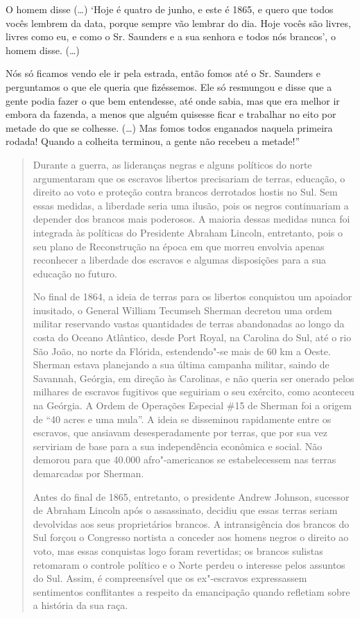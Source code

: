 O homem disse (\ldots{}) `Hoje é quatro de junho, e este é 1865, e quero
que todos vocês lembrem da data, porque sempre vão lembrar do dia. Hoje
vocês são livres, livres como eu, e como o Sr. Saunders e a sua senhora
e todos nós brancos', o homem disse. (\ldots{})

Nós só ficamos vendo ele ir pela estrada, então fomos até o Sr. Saunders
e perguntamos o que ele queria que fizéssemos. Ele só resmungou e disse
que a gente podia fazer o que bem entendesse, até onde sabia, mas que
era melhor ir embora da fazenda, a menos que alguém quisesse ficar e
trabalhar no eito por metade do que se colhesse. (\ldots{}) Mas fomos
todos enganados naquela primeira rodada! Quando a colheita terminou, a
gente não recebeu a metade!''

\begin{quote}
Durante a guerra, as lideranças negras e alguns políticos do norte
argumentaram que os escravos libertos precisariam de terras, educação, o
direito ao voto e proteção contra brancos derrotados hostis no Sul. Sem
essas medidas, a liberdade seria uma ilusão, pois os negros continuariam
a depender dos brancos mais poderosos. A maioria dessas medidas nunca
foi integrada às políticas do Presidente Abraham Lincoln, entretanto,
pois o seu plano de Reconstrução na época em que morreu envolvia apenas
reconhecer a liberdade dos escravos e algumas disposições para a sua
educação no futuro.

No final de 1864, a ideia de terras para os libertos conquistou um
apoiador inusitado, o General William Tecumseh Sherman decretou uma
ordem militar reservando vastas quantidades de terras abandonadas ao
longo da costa do Oceano Atlântico, desde Port Royal, na Carolina do
Sul, até o rio São João, no norte da Flórida, estendendo"-se mais de 60
km a Oeste. Sherman estava planejando a sua última campanha militar,
saindo de Savannah, Geórgia, em direção às Carolinas, e não queria ser
onerado pelos milhares de escravos fugitivos que seguiriam o seu
exército, como aconteceu na Geórgia. A Ordem de Operações Especial \#15
de Sherman foi a origem de ``40 acres e uma mula''. A ideia se
disseminou rapidamente entre os escravos, que ansiavam desesperadamente
por terras, que por sua vez serviriam de base para a sua independência
econômica e social. Não demorou para que 40.000 afro"-americanos se
estabelecessem nas terras demarcadas por Sherman.

Antes do final de 1865, entretanto, o presidente Andrew Johnson,
sucessor de Abraham Lincoln após o assassinato, decidiu que essas terras
seriam devolvidas aos seus proprietários brancos. A intransigência dos
brancos do Sul forçou o Congresso nortista a conceder aos homens negros
o direito ao voto, mas essas conquistas logo foram revertidas; os
brancos sulistas retomaram o controle político e o Norte perdeu o
interesse pelos assuntos do Sul. Assim, é compreensível que os
ex"-escravos expressassem sentimentos conflitantes a respeito da
emancipação quando refletiam sobre a história da sua raça.
\end{quote}

